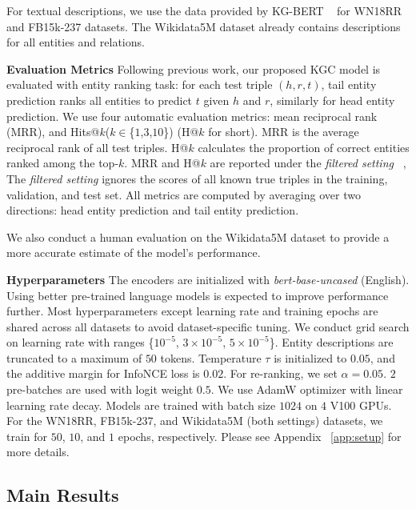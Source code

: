 \documentclass[11pt]{article}
\begin{document}
For textual descriptions,
we use the data provided by KG-BERT ~\citep{yao2019kg} for WN18RR and FB15k-237 datasets.
The Wikidata5M dataset already contains descriptions for all entities and relations.
\newline

\noindent
\textbf{Evaluation Metrics }
Following previous work,
our proposed KGC model is evaluated with entity ranking task:
for each test triple $(h,r,t)$,
tail entity prediction ranks all entities to predict $t$ given $h$ and $r$,
similarly for head entity prediction.
We use four automatic evaluation metrics:
mean reciprocal rank (MRR),
and Hits@$k$($k\in$\{$1$,$3$,$10$\}) (H@$k$ for short).
MRR is the average reciprocal rank of all test triples.
H@$k$ calculates the proportion of correct entities ranked among the top-$k$.
MRR and H@$k$ are reported under the \emph{filtered setting} ~\citep{bordes2013translating},
The \emph{filtered setting} ignores the scores of all known true triples
in the training, validation, and test set.
All metrics are computed by averaging over two directions:
head entity prediction and tail entity prediction.

We also conduct a human evaluation on the Wikidata5M dataset
to provide a more accurate estimate of the model's performance.
\newline

\noindent
\textbf{Hyperparameters }
The encoders are initialized with \emph{bert-base-uncased} (English).
Using better pre-trained language models is expected to improve performance further.
Most hyperparameters except learning rate and training epochs
are shared across all datasets
to avoid dataset-specific tuning.
We conduct grid search on learning rate with ranges \{$10^{-5}$, $3\times10^{-5}$, $5\times10^{-5}$\}.
Entity descriptions are truncated to a maximum of $50$ tokens.
Temperature $\tau$ is initialized to $0.05$,
and the additive margin for InfoNCE loss is $0.02$.
For re-ranking,
we set $\alpha = 0.05$.
$2$ pre-batches are used with logit weight $0.5$.
We use AdamW optimizer with linear learning rate decay.
Models are trained with batch size $1024$ on $4$ V100 GPUs.
For the WN18RR, FB15k-237, and Wikidata5M (both settings) datasets,
we train for $50$, $10$, and $1$ epochs, respectively.
Please see Appendix ~\ref{app:setup} for more details.

\subsection{Main Results}
\end{document}
